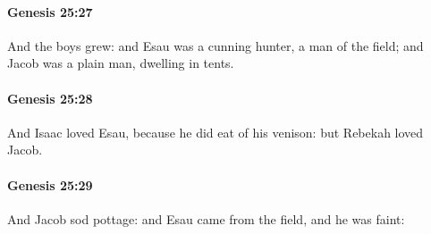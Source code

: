 		\paragraph{Genesis 25:27} %
			\label{GENESIS-25-27}

			And the boys grew: and Esau was a cunning hunter, a man of the field; and Jacob was a plain man, dwelling in tents.


		\paragraph{Genesis 25:28} %
			\label{GENESIS-25-28}

			And Isaac loved Esau, because he did eat of his venison: but Rebekah loved Jacob.


		\paragraph{Genesis 25:29} %
			\label{GENESIS-25-29}

			And Jacob sod pottage: and Esau came from the field, and he was faint:


